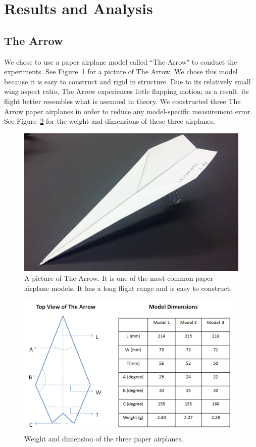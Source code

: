 \section{Results and Analysis}

\subsection{The Arrow}
	\label{sec:arrow}
We chose to use a paper airplane model called ``The Arrow" to conduct the experiments. See Figure~\ref{fig:arrow} for a picture of The Arrow. We chose this model because it is easy to construct and rigid in structure. Due to its relatively small wing aspect ratio, The Arrow experiences little flapping motion; as a result, its flight better resembles what is assumed in theory. We constructed three The Arrow paper airplanes in order to reduce any model-specific measurement error. See Figure~\ref{fig:arrowdimension} for the weight and dimensions of these three airplanes. 

\begin{figure}[hl]
  \centering
    \includegraphics[scale=0.6]{figures/arrow.png}
    \caption{A picture of The Arrow. It is one of the most common paper airplane models. It has a long flight range and is easy to construct.}
  \label{fig:arrow}
\end{figure}

\begin{figure}[hl]
  \centering
    \includegraphics[scale=0.4]{figures/arrowdimension.png}
    \caption{Weight and dimension of the three paper airplanes.}
  \label{fig:arrowdimension}
\end{figure}

